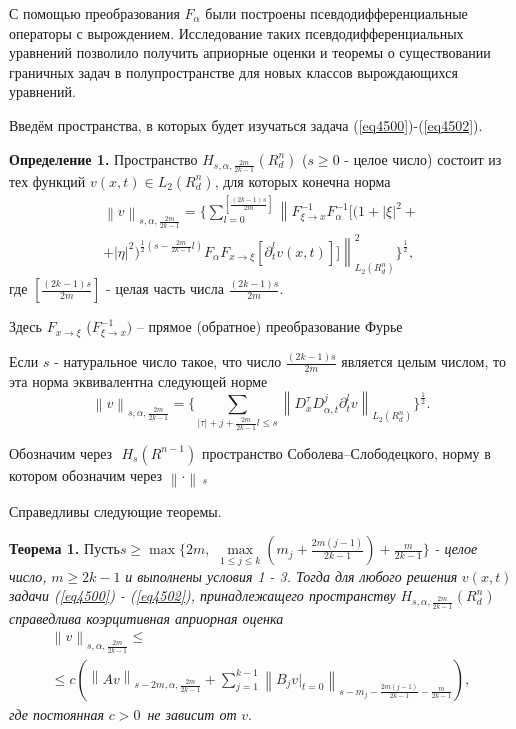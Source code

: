 С помощью преобразования $F_\alpha $ были построены псевдодифференциальные
операторы с вырождением. Исследование таких псевдодифференциальных уравнений
позволило получить априорные оценки и теоремы о существовании граничных
задач в полупространстве для новых классов вырождающихся уравнений.

Введём пространства, в которых будет изучаться задача (\ref{eq4500})-(\ref{eq4502}).

\textbf{Определение 1.} Пространство $H_{s,\alpha ,\frac{2m}{2k - 1}} (R_d^n
)$ ($s \geqslant 0$ - целое число) состоит из тех функций $v(x,t) \in L_2 (R_d^n
)$, для которых конечна норма
\begin{multline*}
	\left\| v \right\|_{s,\alpha ,\frac{2m}{2k - 1}} =
	\{
		\sum\limits_{l = 0}^{[\frac{(2k - 1)s}{2m}]}
		\left\|
			F_{\xi \to x}^{ - 1} F_\alpha ^{ - 1}
			[(1 + \left| \xi \right|^2 +
		\right. \\ + \left.
			\left| \eta \right|^2 )^{\frac{1}{2}(s -
			\frac{2m}{2k - 1}l)}F_\alpha F_{x \to \xi } [\partial _t^l v(x,t)]]
		\right\|_{L_2 (R_d^n )}^2
	\}
	^\frac{1}{2} ,
\end{multline*}
где $[\frac{(2k - 1)s}{2m}]$ - целая часть числа $\frac{(2k - 1)s}{2m}$.

Здесь $F_{x \to \xi } $ ($F_{\xi \to x}^{ - 1} )$ -- прямое (обратное)
преобразование Фурье

Если $s$ - натуральное число такое, что число $\frac{(2k - 1)s}{2m}$
является целым числом, то эта норма эквивалентна следующей норме
\[
\left\| v \right\|_{s,\alpha ,\frac{2m}{2k - 1}} = \{\sum\limits_{\left|
\tau \right| + j + \frac{2m}{2k - 1}l \leqslant s} {\left\| {D_x^\tau D_{\alpha
,t}^j \partial _t^l v} \right\|} _{L_2 (R_d^n )} \}^{\frac{1}{2}}.
\]



Обозначим через $\,\,H_s (R^{n - 1})$ пространство Со\-бо\-ле\-ва--Сло\-бо\-де\-ц\-ко\-го,
норму в котором обозначим через $\left\| \cdot \right\|\,_s \,$

Справедливы следующие теоремы.

\textbf{Теорема 1.} $Пусть s \geqslant \max \{2m,\,\,\mathop {\max }\limits_{1 \leqslant j \leqslant
k} (m_j + \frac{2m(j - 1)}{2k - 1}) + \frac{m}{2k - 1}\}$\textit{ - целое число, }$m \geqslant 2k - 1$\textit{ и выполнены условия 1 - 3. Тогда для любого решения }$v(x,t)$\textit{ задачи (\ref{eq4500}) - (\ref{eq4502}), принадлежащего пространству }$H_{s,\alpha
,\frac{2m}{2k - 1}} (R_d^n )\,$\textit{ справедлива коэрцитивная априорная оценка }
\begin{multline*}
\left\| v \right\|_{s,\alpha ,\frac{2m}{2k - 1}} \leqslant
\\ \leqslant
c(\left\| {Av}
\right\|_{s - 2m,\alpha ,\frac{2m}{2k - 1}} + \sum\limits_{j = 1}^{k - 1}
{\left\| {B_j \left. v \right|_{t = 0} } \right\|_{s - m_j - \frac{2m(j -
1)}{2k - 1} - \frac{m}{2k - 1}} } ),
\end{multline*}
\textit{где постоянная }$c > 0\,$\textit{ не зависит от }$v.$



